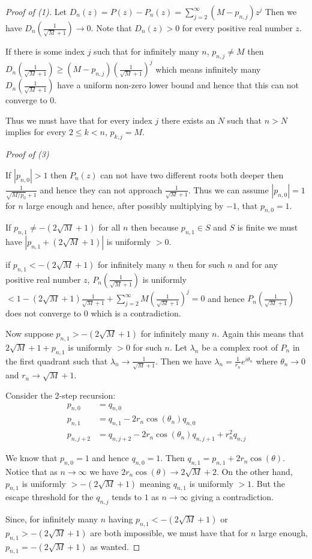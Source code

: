 \documentclass[11pt]{amsart}
\numberwithin{theorem}{section} %
\numberwithin{corollary}{section}
\numberwithin{lemma}{section}
\numberwithin{proposition}{section}
\numberwithin{definition}{section}
\begin{document}
\begin{proof}[Proof of (1)]
Let $D_n(z) = P(z) - P_n(z) = \sum_{j=2}^\infty (M-p_{n, j})z^j$ Then we have $D_n(\frac{1}{\sqrt{M}+1}) \rightarrow 0$. Note that $D_n(z) > 0$ for every positive real number $z$.

If there is some index $j$ such that for infinitely many $n$, $p_{n, j} \neq M$ then $D_n(\frac{1}{\sqrt{M}+1}) \geqslant (M-p_{n, j})(\frac{1}{\sqrt{M}+1})^j$ which means infinitely many $D_n(\frac{1}{\sqrt{M}+1})$ have a uniform non-zero lower bound and hence that this can not converge to $0$.

Thus we must have that for every index $j$ there exists an $N$ such that $n > N$ implies for every $2 \leqslant k < n$, $p_{k, j} = M$.


\bigskip
\noindent \textit{Proof of (3)}

If $|p_{n, 0}| > 1$ then $P_n(z)$ can not have two different roots both deeper then $\frac{1}{\sqrt{M/p_0}+1}$ and hence they can not approach $\frac{1}{\sqrt{M}+1}$. Thus we can assume $|p_{n, 0}| = 1$ for $n$ large enough and hence, after possibly multiplying by $-1$, that $p_{n, 0} = 1$.

If $p_{n, 1} \neq -(2\sqrt{M}+1)$ for all $n$ then because $p_{n, 1} \in S$ and $S$ is finite we must have $|p_{n, 1} + (2\sqrt{M}+1)|$ is uniformly $> 0$.

if $p_{n, 1} < -(2\sqrt{M}+1)$ for infinitely many $n$ then for such $n$ and for any positive real number $z$, $P_n(\frac{1}{\sqrt{M}+1})$ is uniformly $< 1 -(2\sqrt{M}+1)\frac{1}{\sqrt{M}+1} + \sum_{j=2}^\infty M(\frac{1}{\sqrt{M}+1})^j = 0$ and hence $P_n(\frac{1}{\sqrt{M}+1})$ does not converge to $0$ which is a contradiction.

Now suppose $p_{n, 1} > -(2\sqrt{M}+1)$ for infinitely many $n$. Again this means that $2\sqrt{M}+1 + p_{n, 1}$ is uniformly $> 0$ for such $n$. Let $\lambda_n$ be a complex root of $P_n$ in the first quadrant such that $\lambda_n \rightarrow \frac{1}{\sqrt{M}+1}$. Then we have $\lambda_n = \frac{1}{r_n}e^{i\theta_n}$ where $\theta_n \rightarrow 0$ and $r_n \rightarrow \sqrt{M}+1$.

Consider the 2-step recursion:
\begin{align*}
p_{n, 0} &= q_{n, 0}\\
p_{n, 1} &= q_{n, 1} - 2r_n\cos(\theta_n)q_{n, 0} \\
p_{n, j+2} &= q_{n, j+2} - 2r_n\cos(\theta_n)q_{n, j+1} + r^2_nq_{n, j}
\end{align*}

We know that $p_{n, 0} = 1$ and hence $q_{n, 0} = 1$. Then $q_{n, 1} = p_{n, 1} + 2r_n\cos(\theta)$. Notice that as $n \rightarrow \infty$ we have $2r_n\cos(\theta) \rightarrow 2\sqrt{M} + 2$. On the other hand, $p_{n, 1}$ is uniformly $> -(2\sqrt{M} + 1)$ meaning $q_{n, 1}$ is uniformly $> 1$. But the escape threshold for the $q_{n, j}$ tends to $1$ as $n \rightarrow \infty$ giving a contradiction.

Since, for infinitely many $n$ having $p_{n, 1} < -(2\sqrt{M}+1)$ or $p_{n, 1} > -(2\sqrt{M}+1)$ are both impossible, we must have that for $n$ large enough, $p_{n, 1} = -(2\sqrt{M}+1)$ as wanted.

\end{proof}
\end{document}
